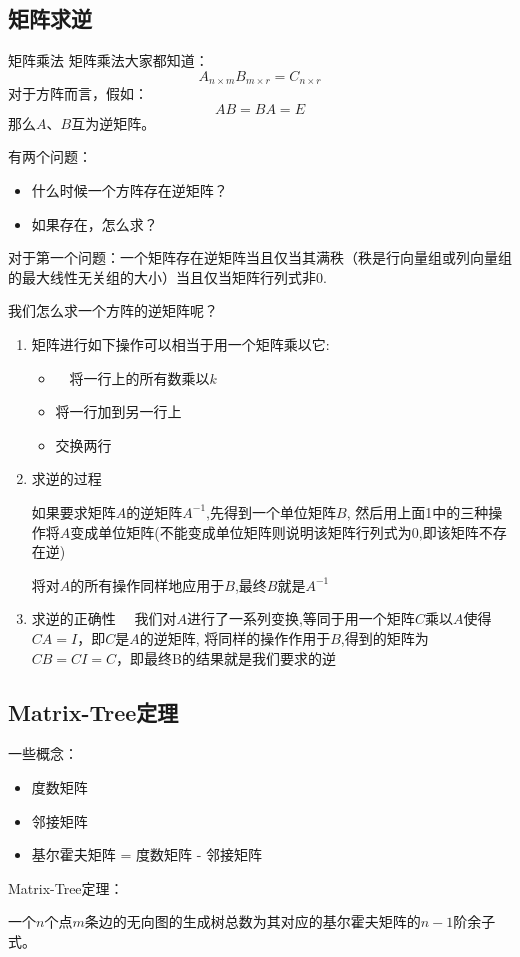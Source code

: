 \documentclass[9pt]{beamer}
\begin{document}
		\subsection{矩阵求逆}
		\begin{frame}{矩阵乘法}
			矩阵乘法大家都知道：
			$$
				A_{n\times m}B_{m\times r} = C_{n\times r}
			$$
			对于方阵而言，假如：
			$$
				AB = BA = E
			$$
			那么$A$、$B$互为逆矩阵。
			
			有两个问题：
			\begin{itemize}
				\item 什么时候一个方阵存在逆矩阵？
				\item 如果存在，怎么求？
			\end{itemize}
		\end{frame}
		\begin{frame}
			对于第一个问题：一个矩阵存在逆矩阵当且仅当其满秩（秩是行向量组或列向量组的最大线性无关组的大小）当且仅当矩阵行列式非0.
			
			我们怎么求一个方阵的逆矩阵呢？
			\begin{enumerate}
				\item 矩阵进行如下操作可以相当于用一个矩阵乘以它:
				
				\begin{itemize}
					\item　将一行上的所有数乘以$k$
					\item 将一行加到另一行上
					\item 交换两行
				\end{itemize}
				
				\item 求逆的过程
				
				如果要求矩阵$A$的逆矩阵$A^{-1}$,先得到一个单位矩阵$B$,
				然后用上面1中的三种操作将$A$变成单位矩阵(不能变成单位矩阵则说明该矩阵行列式为0,即该矩阵不存在逆)
				
				将对$A$的所有操作同样地应用于$B$,最终$B$就是$A^{-1}$
				\item  求逆的正确性
				　我们对$A$进行了一系列变换,等同于用一个矩阵$C$乘以$A$使得 $CA = I$，即$C$是$A$的逆矩阵, 将同样的操作作用于$B$,得到的矩阵为 $CB = CI = C$，即最终B的结果就是我们要求的逆
			\end{enumerate}
		\end{frame}
		\subsection{Matrix-Tree定理}
		\begin{frame}
			一些概念：\pause 
			\begin{itemize}
				\item 度数矩阵 \pause 
				\item 邻接矩阵 \pause 
				\item 基尔霍夫矩阵 = 度数矩阵 - 邻接矩阵
			\end{itemize}
			
			\pause
			Matrix-Tree定理： \pause
			\begin{theorem}
				一个$n$个点$m$条边的无向图的生成树总数为其对应的基尔霍夫矩阵的$n-1$阶余子式。
			\end{theorem}
		\end{frame}
		
\end{document}
